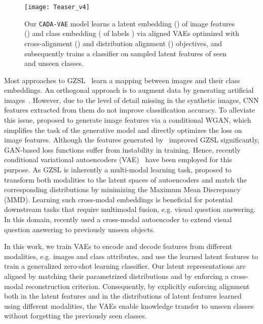 \documentclass[10pt,twocolumn,letterpaper]{article}
\begin{document}
\begin{figure}[t]
\centering
\texttt{[image: Teaser\_v4]}
\caption{Our \texttt{CADA-VAE} model learns a latent embedding () of image features () and class embedding ( of labels ) via aligned VAEs optimized with cross-alignment () and distribution alignment () objectives, and subsequently trains a classifier on sampled latent features of seen and unseen classes. }
\label{fig:teaser}
\end{figure}

Most approaches to GZSL~\cite{devise,ss,norouzi2013zero,latem,sje} learn a mapping between images and their class embeddings.
An orthogonal approach is to augment data by generating artificial images~\cite{reed}. However, due to the level of detail missing in the synthetic images, CNN features extracted from them do not improve classification accuracy. To alleviate this issue, \cite{featgen} proposed to generate image features via a conditional WGAN, which simplifies the task of the generative model and directly optimizes the loss on image features. Although the features generated by~\cite{featgen} improved GZSL significantly, GAN-based loss functions suffer from instability in training. Hence, recently conditional variational autoencoders (VAE)~\cite{cvae,segzsl} have been employed for this purpose. As GZSL is inherently a multi-modal learning task, \cite{tsai2017learning} proposed to transform both modalities to the latent spaces of autoencoders and match the corresponding distributions by minimizing the Maximum Mean Discrepancy (MMD).
Learning such cross-modal embeddings is beneficial for potential downstream tasks that require multimodal fusion, e.g. visual question answering. In this domain, \cite{ramakrishnan2017empirical} recently used a cross-modal autoencoder to extend visual question answering to previously unseen objects.

In this work, we train VAEs to encode and decode features from different modalities, e.g. images and class attributes, and use the learned latent features to train a generalized zero-shot learning classifier. Our latent representations are aligned by matching their parametrized distributions and by enforcing a cross-modal reconstruction criterion.
Consequently, by explicitly enforcing alignment both in the latent features and in the distributions of latent features learned using different modalities, the VAEs enable knowledge transfer to unseen classes without forgetting the previously seen classes.
\end{document}
